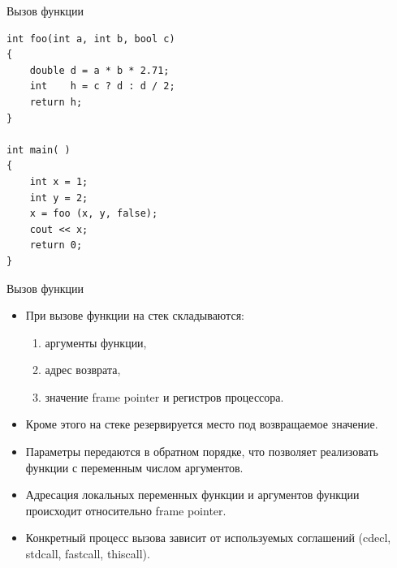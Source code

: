 \documentclass[aspectration=1610,t]{beamer}
\begin{document}
\begin{frame}[fragile]{Вызов функции}
\begin{minipage}{.3\textwidth}
    \end{minipage}\hfill
    \begin{minipage}{.6\textwidth}
        \begin{lstlisting}
int foo(int a, int b, bool c) 
{
    double d = a * b * 2.71;
    int    h = c ? d : d / 2;
    return h;
}

int main( ) 
{
    int x = 1;
    int y = 2;
    x = foo (x, y, false);
    cout << x;
    return 0;
}
        \end{lstlisting}
    \end{minipage}
\end{frame}

\begin{frame}[fragile]{Вызов функции}
    \begin{itemize}
        \item При вызове функции на стек складываются:
            \begin{enumerate}
                \item аргументы функции,
                \item адрес возврата,
                \item значение frame pointer и регистров процессора.
            \end{enumerate}
        \item Кроме этого на стеке резервируется место под
            возвращаемое значение.
        \item Параметры передаются в обратном порядке, что позволяет
            реализовать функции с переменным числом аргументов.
        \item Адресация локальных переменных функции и аргументов
            функции происходит относительно frame pointer.
        \item Конкретный процесс вызова зависит от используемых 
            соглашений (cdecl,  stdcall, fastcall, thiscall).
    \end{itemize}
\end{frame}
\end{document}
